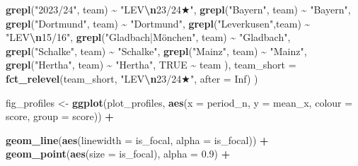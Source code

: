 \documentclass[
]{article}
\newenvironment{Shaded}{\begin{snugshade}}{\end{snugshade}}
\newcommand{\AttributeTok}[1]{\textcolor[rgb]{0.13,0.29,0.53}{#1}}
\newcommand{\ConstantTok}[1]{\textcolor[rgb]{0.56,0.35,0.01}{#1}}
\newcommand{\FloatTok}[1]{\textcolor[rgb]{0.00,0.00,0.81}{#1}}
\newcommand{\FunctionTok}[1]{\textcolor[rgb]{0.13,0.29,0.53}{\textbf{#1}}}
\newcommand{\NormalTok}[1]{#1}
\newcommand{\OtherTok}[1]{\textcolor[rgb]{0.56,0.35,0.01}{#1}}
\newcommand{\SpecialCharTok}[1]{\textcolor[rgb]{0.81,0.36,0.00}{\textbf{#1}}}
\newcommand{\StringTok}[1]{\textcolor[rgb]{0.31,0.60,0.02}{#1}}
\begin{document}
\begin{Shaded}
\begin{Highlighting}[]
      \FunctionTok{grepl}\NormalTok{(}\StringTok{"2023/24"}\NormalTok{,   team)         }\SpecialCharTok{\textasciitilde{}} \StringTok{"LEV}\SpecialCharTok{\textbackslash{}n}\StringTok{23/24★"}\NormalTok{,}
      \FunctionTok{grepl}\NormalTok{(}\StringTok{"Bayern"}\NormalTok{,    team)         }\SpecialCharTok{\textasciitilde{}} \StringTok{"Bayern"}\NormalTok{,}
      \FunctionTok{grepl}\NormalTok{(}\StringTok{"Dortmund"}\NormalTok{,  team)         }\SpecialCharTok{\textasciitilde{}} \StringTok{"Dortmund"}\NormalTok{,}
      \FunctionTok{grepl}\NormalTok{(}\StringTok{"Leverkusen"}\NormalTok{,team)         }\SpecialCharTok{\textasciitilde{}} \StringTok{"LEV}\SpecialCharTok{\textbackslash{}n}\StringTok{15/16"}\NormalTok{,}
      \FunctionTok{grepl}\NormalTok{(}\StringTok{"Gladbach|Mönchen"}\NormalTok{, team)  }\SpecialCharTok{\textasciitilde{}} \StringTok{"Gladbach"}\NormalTok{,}
      \FunctionTok{grepl}\NormalTok{(}\StringTok{"Schalke"}\NormalTok{,   team)         }\SpecialCharTok{\textasciitilde{}} \StringTok{"Schalke"}\NormalTok{,}
      \FunctionTok{grepl}\NormalTok{(}\StringTok{"Mainz"}\NormalTok{,     team)         }\SpecialCharTok{\textasciitilde{}} \StringTok{"Mainz"}\NormalTok{,}
      \FunctionTok{grepl}\NormalTok{(}\StringTok{"Hertha"}\NormalTok{,    team)         }\SpecialCharTok{\textasciitilde{}} \StringTok{"Hertha"}\NormalTok{,}
      \ConstantTok{TRUE} \SpecialCharTok{\textasciitilde{}}\NormalTok{ team}
\NormalTok{    ),}
    \AttributeTok{team\_short =} \FunctionTok{fct\_relevel}\NormalTok{(team\_short, }\StringTok{"LEV}\SpecialCharTok{\textbackslash{}n}\StringTok{23/24★"}\NormalTok{, }\AttributeTok{after =} \ConstantTok{Inf}\NormalTok{)}
\NormalTok{  )}

\NormalTok{fig\_profiles }\OtherTok{\textless{}{-}} \FunctionTok{ggplot}\NormalTok{(plot\_profiles,}
       \FunctionTok{aes}\NormalTok{(}\AttributeTok{x      =}\NormalTok{ period\_n,}
           \AttributeTok{y      =}\NormalTok{ mean\_x,}
           \AttributeTok{colour =}\NormalTok{ score,}
           \AttributeTok{group  =}\NormalTok{ score)) }\SpecialCharTok{+}
  
  \FunctionTok{geom\_line}\NormalTok{(}\FunctionTok{aes}\NormalTok{(}\AttributeTok{linewidth =}\NormalTok{ is\_focal, }\AttributeTok{alpha =}\NormalTok{ is\_focal)) }\SpecialCharTok{+}
  \FunctionTok{geom\_point}\NormalTok{(}\FunctionTok{aes}\NormalTok{(}\AttributeTok{size =}\NormalTok{ is\_focal), }\AttributeTok{alpha =} \FloatTok{0.9}\NormalTok{) }\SpecialCharTok{+}
  

\end{Highlighting}
\end{Shaded}
\end{document}

